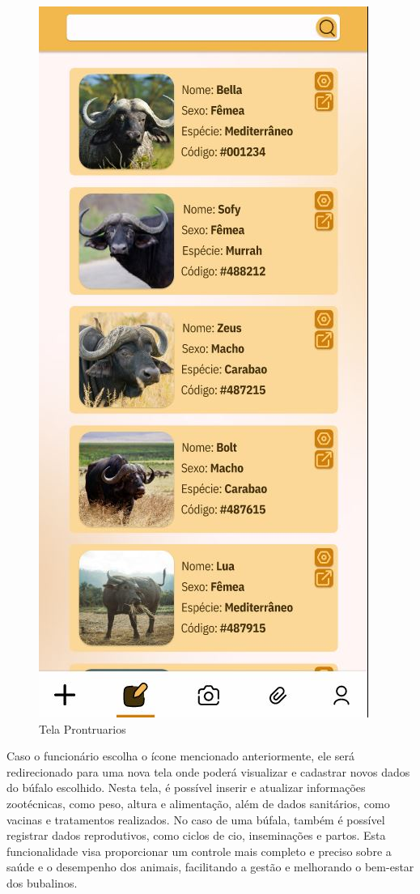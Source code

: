 \newpage
\begin{figure}[!h]
\centering
\caption{Tela Prontruarios}%
\label{fig:ux-mobile02}
\includegraphics[scale=0.5]{Illustrations/UX-Mobile/Mobi-03.JPG}
\end{figure}

Caso o funcionário escolha o ícone mencionado anteriormente, ele será redirecionado para uma nova tela  onde poderá visualizar e cadastrar novos dados do búfalo escolhido. Nesta tela, é possível inserir e atualizar informações zootécnicas, como peso, altura e alimentação, além de dados sanitários, como vacinas e tratamentos realizados. No caso de uma búfala, também é possível registrar dados reprodutivos, como ciclos de cio, inseminações e partos. Esta funcionalidade visa proporcionar um controle mais completo e preciso sobre a saúde e o desempenho dos animais, facilitando a gestão e melhorando o bem-estar dos bubalinos.

